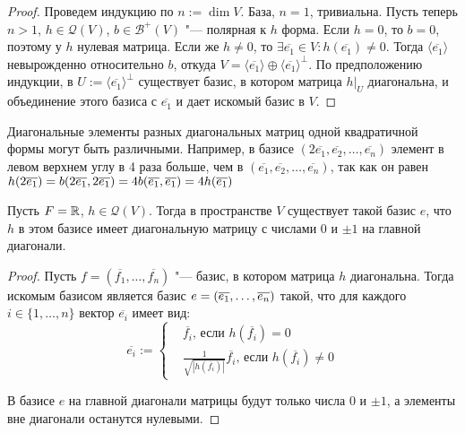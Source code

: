 \begin{proof}
	Проведем индукцию по $n := \dim{V}$. База, $n = 1$, тривиальна. Пусть теперь $n > 1$, $h \in \mathcal{Q}(V)$, $b \in \mathcal{B}^+(V)$ "--- полярная к $h$ форма. Если $h = 0$, то $b = 0$, поэтому у $h$ нулевая матрица. Если же $h \ne 0$, то $\exists \overline{e_1} \in V: h(\overline{e_1}) \ne 0$. Тогда $\langle\overline{e_1}\rangle$ невырожденно относительно $b$, откуда $V = \langle\overline{e_1}\rangle \oplus \langle\overline{e_1}\rangle^\perp$. По предположению индукции, в $U := \langle\overline{e_1}\rangle^\perp$ существует базис, в котором матрица $h|_U$ диагональна, и объединение этого базиса с $\overline{e_1}$ и дает искомый базис в $V$.
\end{proof}

\begin{note}
	Диагональные элементы разных диагональных матриц одной квадратичной формы могут быть различными. Например, в базисе $(2\overline{e_1}, \overline{e_2}, \dots, \overline{e_n})$ элемент в левом верхнем углу в 4 раза больше, чем в $(\overline{e_1}, \overline{e_2}, \dots, \overline{e_n})$, так как он равен $h(2\overline{e_1}) = b(2\overline{e_1}, 2\overline{e_1}) \hm{=} 4b(\overline{e_1}, \overline{e_1}) = 4h(\overline{e_1})$
\end{note}

\begin{corollary}
	Пусть $F = \mathbb{R}$, $h \in \mathcal{Q}(V)$. Тогда в пространстве $V$ существует такой базис $e$, что $h$ в этом базисе имеет диагональную матрицу с числами $0$ и $\pm1$ на главной диагонали.
\end{corollary}

\begin{proof}
	Пусть $f = (\overline{f_1}, \dots, \overline{f_n})$ "--- базис, в котором матрица $h$ диагональна. Тогда искомым базисом является базис $e \hm{=} (\overline{e_1}, \dots, \overline{e_n})$ такой, что для каждого $i \in \{1, \dotsc, n\}$ вектор $\overline{e_i}$ имеет вид:
	\[\overline{e_i} := \left\{\begin{aligned}
		&\overline{f_i}\text{, если }h(\overline{f_i}) = 0\\
		&\frac{1}{\sqrt{\left|h(\overline{f_i})\right|}}\overline{f_i}\text{, если }h(\overline{f_i}) \ne 0
	\end{aligned}\right.\]
	
	В базисе $e$ на главной диагонали матрицы будут только числа $0$ и $\pm1$, а элементы вне диагонали останутся нулевыми.
\end{proof}